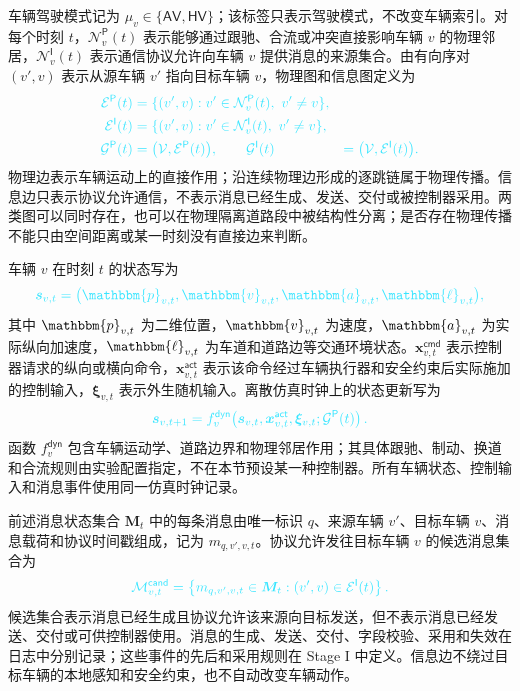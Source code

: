 \documentclass[10pt,a4paper,twocolumn]{article}
\newcommand{\revBlue}[1]{#1}
\begin{document}
\revBlue{车辆驾驶模式记为 $\mu_v\in\{\mathsf{AV},\mathsf{HV}\}$；该标签只表示驾驶模式，不改变车辆索引。对每个时刻 $t$，$\mathcal{N}_v^{\mathsf P}(t)$ 表示能够通过跟驰、合流或冲突直接影响车辆 $v$ 的物理邻居，$\mathcal{N}_v^{\mathsf I}(t)$ 表示通信协议允许向车辆 $v$ 提供消息的来源集合。由有向序对 $(v',v)$ 表示从源车辆 $v'$ 指向目标车辆 $v$，物理图和信息图定义为}
\begin{equation}
\color{advisorBlue}
\begin{aligned}
\mathcal{E}^{\mathsf P}(t)&=\{(v',v):v'\in\mathcal{N}_v^{\mathsf P}(t),\ v'\neq v\},\\
\mathcal{E}^{\mathsf I}(t)&=\{(v',v):v'\in\mathcal{N}_v^{\mathsf I}(t),\ v'\neq v\},\\
\mathcal{G}^{\mathsf P}(t)&=\bigl(\mathcal{V},\mathcal{E}^{\mathsf P}(t)\bigr),\qquad
\mathcal{G}^{\mathsf I}(t)&=\bigl(\mathcal{V},\mathcal{E}^{\mathsf I}(t)\bigr).
\end{aligned}
\end{equation}
物理边表示车辆运动上的直接作用；沿连续物理边形成的逐跳链属于物理传播。信息边只表示协议允许通信，不表示消息已经生成、发送、交付或被控制器采用。两类图可以同时存在，也可以在物理隔离道路段中被结构性分离；是否存在物理传播不能只由空间距离或某一时刻没有直接边来判断。

车辆 $v$ 在时刻 $t$ 的状态写为
\begin{equation}
\color{advisorBlue}
\bm s_{v,t}=\bigl(\mathbbm{p}_{v,t},\mathbbm{v}_{v,t},\mathbbm{a}_{v,t},\mathbbm{\ell}_{v,t}\bigr),
\end{equation}
其中 $\mathbbm{p}_{v,t}$ 为二维位置，$\mathbbm{v}_{v,t}$ 为速度，$\mathbbm{a}_{v,t}$ 为实际纵向加速度，$\mathbbm{\ell}_{v,t}$ 为车道和道路边等交通环境状态。$\bm x_{v,t}^{\mathsf{cmd}}$ 表示控制器请求的纵向或横向命令，$\bm x_{v,t}^{\mathsf{act}}$ 表示该命令经过车辆执行器和安全约束后实际施加的控制输入，$\boldsymbol\xi_{v,t}$ 表示外生随机输入。离散仿真时钟上的状态更新写为
\begin{equation}
\color{advisorBlue}
\bm s_{v,t+1}=f_v^{\mathsf{dyn}}\!\left(\bm s_{v,t},\bm x_{v,t}^{\mathsf{act}},\boldsymbol\xi_{v,t};\mathcal G^{\mathsf P}(t)\right).
\end{equation}
函数 $f_v^{\mathsf{dyn}}$ 包含车辆运动学、道路边界和物理邻居作用；其具体跟驰、制动、换道和合流规则由实验配置指定，不在本节预设某一种控制器。所有车辆状态、控制输入和消息事件使用同一仿真时钟记录。

前述消息状态集合 $\bm M_t$ 中的每条消息由唯一标识 $q$、来源车辆 $v'$、目标车辆 $v$、消息载荷和协议时间戳组成，记为 $m_{q,v',v,t}$。协议允许发往目标车辆 $v$ 的候选消息集合为
\begin{equation}
\color{advisorBlue}
\mathcal M_{v,t}^{\mathsf{cand}}=\left\{m_{q,v',v,t}\in \bm M_t:
(v',v)\in\mathcal{E}^{\mathsf I}(t)\right\}.
\end{equation}
候选集合表示消息已经生成且协议允许该来源向目标发送，但不表示消息已经发送、交付或可供控制器使用。消息的生成、发送、交付、字段校验、采用和失效在日志中分别记录；这些事件的先后和采用规则在 Stage I 中定义。信息边不绕过目标车辆的本地感知和安全约束，也不自动改变车辆动作。
\end{document}
